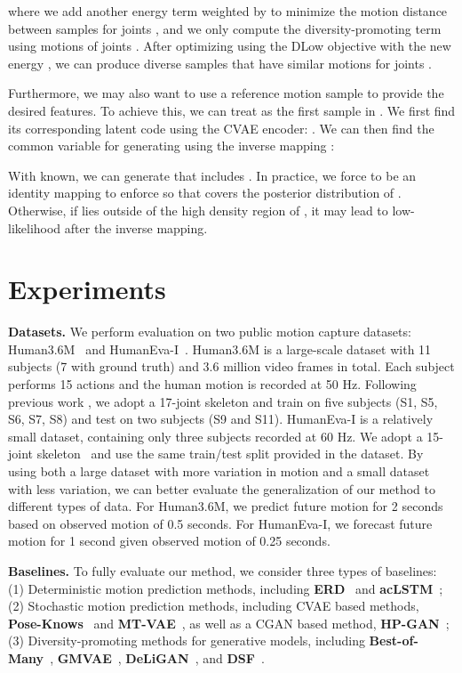 \documentclass[runningheads]{llncs}
\begin{document}
	where we add another energy term  weighted by  to minimize the motion distance between samples for joints , and we only compute the diversity-promoting term  using motions of joints .
	After optimizing  using the DLow objective with the new energy , we can produce diverse samples  that have similar motions for joints .
	
	Furthermore, we may also want to use a reference motion sample  to provide the desired features. To achieve this, we can treat  as the first sample  in . We first find its corresponding latent code  using the CVAE encoder: . We can then find the common variable  for generating  using the inverse mapping :
	
	With  known, we can generate  that includes .
	In practice, we force  to be an identity mapping to enforce  so that  covers the posterior distribution of . Otherwise, if  lies outside of the high density region of , it may lead to low-likelihood  after the inverse mapping.
	
	
	\vspace{-3mm}
	\section{Experiments}
	\vspace{-2mm}
	
	\noindent\textbf{Datasets.}
	We perform evaluation on two public motion capture datasets: Human3.6M~\cite{ionescu2013human3} and HumanEva-I~\cite{sigal2010humaneva}. Human3.6M is a large-scale dataset with 11 subjects (7 with ground truth) and 3.6 million video frames in total. Each subject performs 15 actions and the human motion is recorded at 50 Hz. Following previous work \cite{martinez2017simple,luvizon20182d,yang20183d,pavllo20193d}, we adopt a 17-joint skeleton and train on five subjects (S1, S5, S6, S7, S8) and test on two subjects (S9 and S11). HumanEva-I is a relatively small dataset, containing only three subjects recorded at 60 Hz. We adopt a 15-joint skeleton~\cite{pavllo20193d} and use the same train/test split provided in the dataset. By using both a large dataset with more variation in motion and a small dataset with less variation, we can better evaluate the generalization of our method to different types of data. For Human3.6M, we predict future motion for 2 seconds based on observed motion of 0.5 seconds. For HumanEva-I, we forecast future motion for 1 second given observed motion of 0.25 seconds.
	
	\vspace{1mm}
	\noindent\textbf{Baselines.}
	To fully evaluate our method, we consider three types of baselines: (1) Deterministic motion prediction methods, including \textbf{ERD}~\cite{fragkiadaki2015recurrent} and \textbf{acLSTM}~\cite{li2017auto}; (2) Stochastic motion prediction methods, including CVAE based methods, \textbf{Pose-Knows}~\cite{walker2017pose} and \textbf{MT-VAE}~\cite{yan2018mt}, as well as a CGAN based method, \textbf{HP-GAN}~\cite{barsoum2018hp}; (3) Diversity-promoting methods for generative models, including \textbf{Best-of-Many}~\cite{bhattacharyya2018accurate}, \textbf{GMVAE}~\cite{dilokthanakul2016deep}, \textbf{DeLiGAN}~\cite{gurumurthy2017deligan}, and \textbf{DSF}~\cite{yuan2019diverse}.
	
\end{document}
